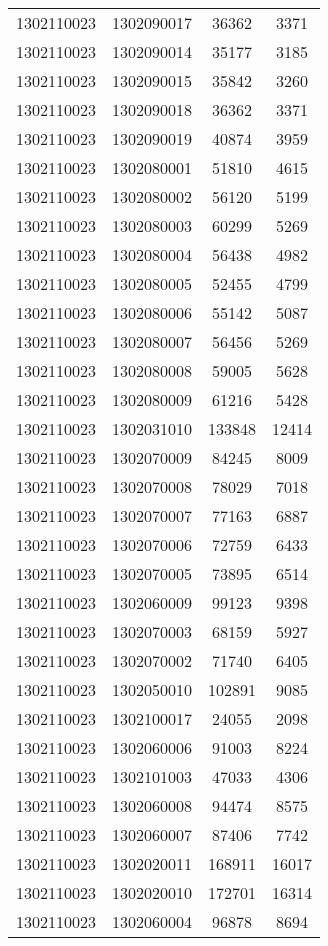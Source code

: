 \begin{longtable}[h]{llcc}
		1302110023 & 1302090017 & 36362 & 3371\\
		1302110023 & 1302090014 & 35177 & 3185\\
		1302110023 & 1302090015 & 35842 & 3260\\
		1302110023 & 1302090018 & 36362 & 3371\\
		1302110023 & 1302090019 & 40874 & 3959\\
		1302110023 & 1302080001 & 51810 & 4615\\
		1302110023 & 1302080002 & 56120 & 5199\\
		1302110023 & 1302080003 & 60299 & 5269\\
		1302110023 & 1302080004 & 56438 & 4982\\
		1302110023 & 1302080005 & 52455 & 4799\\
		1302110023 & 1302080006 & 55142 & 5087\\
		1302110023 & 1302080007 & 56456 & 5269\\
		1302110023 & 1302080008 & 59005 & 5628\\
		1302110023 & 1302080009 & 61216 & 5428\\
		1302110023 & 1302031010 & 133848 & 12414\\
		1302110023 & 1302070009 & 84245 & 8009\\
		1302110023 & 1302070008 & 78029 & 7018\\
		1302110023 & 1302070007 & 77163 & 6887\\
		1302110023 & 1302070006 & 72759 & 6433\\
		1302110023 & 1302070005 & 73895 & 6514\\
		1302110023 & 1302060009 & 99123 & 9398\\
		1302110023 & 1302070003 & 68159 & 5927\\
		1302110023 & 1302070002 & 71740 & 6405\\
		1302110023 & 1302050010 & 102891 & 9085\\
		1302110023 & 1302100017 & 24055 & 2098\\
		1302110023 & 1302060006 & 91003 & 8224\\
		1302110023 & 1302101003 & 47033 & 4306\\
		1302110023 & 1302060008 & 94474 & 8575\\
		1302110023 & 1302060007 & 87406 & 7742\\
		1302110023 & 1302020011 & 168911 & 16017\\
		1302110023 & 1302020010 & 172701 & 16314\\
		1302110023 & 1302060004 & 96878 & 8694\\

\end{longtable}
